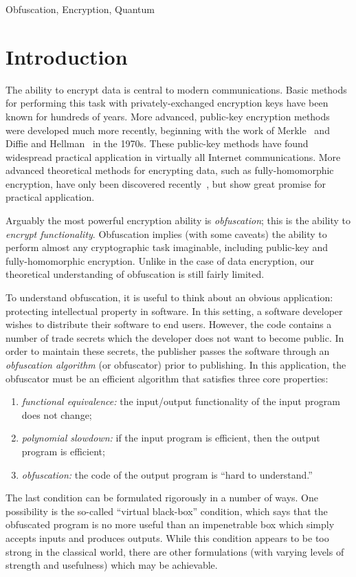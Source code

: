 \documentclass[envcountsame]{llncs}
\numberwithin{equation}{section}
\begin{document}
\begin{keywords}
Obfuscation, Encryption, Quantum \end{keywords}


\section{Introduction}\label{sec:intro}

The ability to encrypt data is central to modern communications. Basic methods for performing this task with privately-exchanged encryption keys have been known for hundreds of years. More advanced, public-key encryption methods were developed much more recently, beginning with the work of Merkle~\cite{Merkle78} and Diffie and Hellman~\cite{DH76} in the 1970s. These public-key methods have found widespread practical application in virtually all Internet communications. More advanced theoretical methods for encrypting data, such as fully-homomorphic encryption, have only been discovered recently~\cite{Gentry09}, but show great promise for practical application.

Arguably the most powerful encryption ability is \emph{obfuscation}; this is the ability to \emph{encrypt functionality}. Obfuscation implies (with some caveats) the ability to perform almost any cryptographic task imaginable, including public-key and fully-homomorphic encryption. Unlike in the case of data encryption, our theoretical understanding of obfuscation is still fairly limited. 

To understand obfuscation, it is useful to think about an obvious application: protecting intellectual property in software. In this setting, a software developer wishes to distribute their software to end users. However, the code contains a number of trade secrets which the developer does not want to become public. In order to maintain these secrets, the publisher passes the software through an \emph{obfuscation algorithm} (or obfuscator) prior to publishing. In this application, the obfuscator must be an efficient algorithm that satisfies three core properties: 
\begin{enumerate}\label{def:obf-informal}
\item \emph{functional equivalence:} the input/output functionality of the input program does not change;
\item \emph{polynomial slowdown:} if the input program is efficient, then the output program is efficient;
\item \emph{obfuscation:} the code of the output program is ``hard to understand.''
\end{enumerate}
The last condition can be formulated rigorously in a number of ways. One possibility is the so-called ``virtual black-box'' condition, which says that the obfuscated program is no more useful than an impenetrable box which simply accepts inputs and produces outputs. While this condition appears to be too strong in the classical world, there are other formulations (with varying levels of strength and usefulness) which may be achievable.
\end{document}

